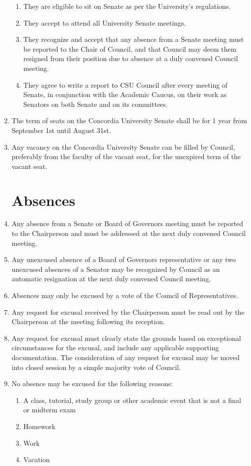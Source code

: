 \documentclass[oneside]{book}
\begin{document}
\begin{enumerate}
\begin{enumerate}
\item They are eligible to sit on Senate as per the University's regulations. 
\item They accept to attend all University Senate meetings. 
\item They recognize and accept that any absence from a Senate meeting must
be reported to the Chair of Council, and that Council may deem them
resigned from their position due to absence at a duly convened Council
meeting. 
\item They agree to write a report to CSU Council after every meeting of
Senate, in conjunction with the Academic Caucus, on their work as
Senators on both Senate and on its committees. 
\end{enumerate}
\item The term of seats on the Concordia University Senate shall be for
1 year from September 1st until August 31st. 
\item Any vacancy on the Concordia University Senate can be filled by Council,
preferably from the faculty of the vacant seat, for the unexpired
term of the vacant seat. 

\chapter{\label{University_bodies_absences}Absences}
\item Any absence from a Senate or Board of Governors meeting must be reported to the Chairperson and must be addressed at the next duly convened Council meeting.
\item Any unexcused absence of a Board of Governors representative or any two unexcused absences of a Senator may be recognized by Council as an automatic resignation at the next duly convened Council meeting. 
\item Absences may only be excused by a vote of the Council of Representatives.
\item Any request for excusal received by the Chairperson must be read out by the Chairperson at the meeting following its reception. 
\item Any request for excusal must clearly state the grounds based on exceptional circumstances for the excusal, and include any applicable supporting documentation. The consideration of any request for excusal may be moved into closed session by a simple majority vote of Council.
\item No absence may be excused for the following reasons:
\begin{enumerate}
\item A class, tutorial, study group or other academic event that is not a final or midterm exam
\item Homework
\item Work
\item Vacation
\end{enumerate}


\end{enumerate}
\end{document}
